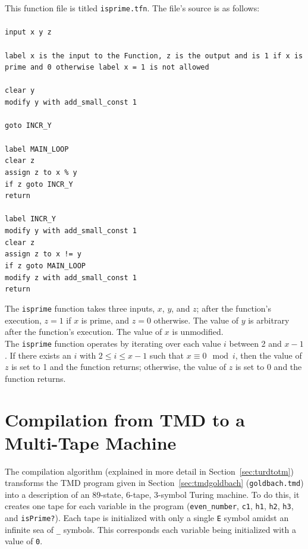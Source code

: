 This function file is titled \texttt{isprime.tfn}. The file's source is as follows: \\ \\
{\tt input x y z \\ \\
label x is the input to the Function, z is the output and is 1 if x is prime and 0 otherwise
label x = 1 is not allowed \\ \\
clear y \\
modify y with add\_small\_const 1 \\ \\ 
goto INCR\_Y \\ \\
label MAIN\_LOOP \\
clear z \\
assign z to x \% y \\
if z goto INCR\_Y \\
return \\ \\
label INCR\_Y \\
modify y with add\_small\_const 1 \\
clear z \\
assign z to x != y \\
if z goto MAIN\_LOOP \\
modify z with add\_small\_const 1 \\
return \\ }

The \texttt{isprime} function takes three inputs, $x$, $y$, and $z$; after the function's execution, $z = 1$ if $x$ is prime, and $z = 0$ otherwise. The value of $y$ is arbitrary after the function's execution. The value of $x$ is unmodified. \\

The \texttt{isprime} function operates by iterating over each value $i$ between 2 and $x-1$. If there exists an $i$ with $2 \le i \le x-1$ such that $x \equiv 0 \mod i$, then the value of $z$ is set to 1 and the function returns; otherwise, the value of $z$ is set to 0 and the function returns. \\

\section{Compilation from TMD to a Multi-Tape Machine \label{sec:turdtotmgoldbach}}

The compilation algorithm (explained in more detail in Section~\ref{sec:turdtotm}) transforms the TMD program given in Section~\ref{sec:tmdgoldbach} (\texttt{goldbach.tmd}) into a description of an 89-state, 6-tape, 3-symbol Turing machine. To do this, it creates one tape for each variable in the program (\texttt{even\_number}, \texttt{c1}, \texttt{h1}, \texttt{h2}, \texttt{h3}, and \texttt{isPrime?}). Each tape is initialized with only a single \texttt{E} symbol amidst an infinite sea of \texttt{\_} symbols. This corresponds each variable being initialized with a value of \texttt{0}. \\

